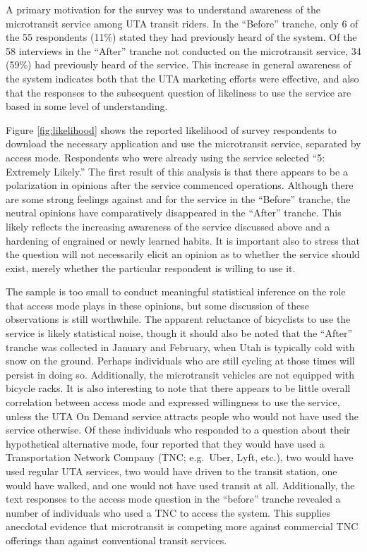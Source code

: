 \documentclass[smartcities,article,submit,moreauthors,pdftex]{mdpi}
\begin{document}
A primary motivation for the survey was to understand awareness of the
microtransit service among UTA transit riders. In the ``Before'' tranche, only 6
of the 55 respondents (11\%) stated they had previously heard of the system. Of
the 58 interviews in the ``After'' tranche not conducted on the microtransit
service, 34 (59\%) had previously heard of the service. This increase in general
awareness of the system indicates both that the UTA marketing efforts were
effective, and also that the responses to the subsequent question of likeliness
to use the service are based in some level of understanding.

Figure \ref{fig:likelihood} shows the reported likelihood of survey respondents
to download the necessary application and use the microtransit service,
separated by access mode. Respondents who were already using the service
selected ``5: Extremely Likely.'' The first result of this analysis is that there
appears to be a polarization in opinions after the service commenced operations.
Although there are some strong feelings against and for the service in the
``Before'' tranche, the neutral opinions have comparatively disappeared in the
``After'' tranche. This likely reflects the increasing awareness of the service
discussed above and a hardening of engrained or newly learned habits. It is
important also to stress that the question will not necessarily elicit an
opinion as to whether the service should exist, merely whether the particular
respondent is willing to use it.

The sample is too small to conduct meaningful statistical inference on the role
that access mode plays in these opinions, but some discussion of these
observations is still worthwhile. The apparent reluctance of bicyclists to use
the service is likely statistical noise, though it should also be noted that the
``After'' tranche was collected in January and February, when Utah is typically
cold with snow on the ground. Perhaps individuals who are still cycling at those
times will persist in doing so. Additionally, the microtransit vehicles are not
equipped with bicycle racks. It is also interesting to note that there
appears to be little overall correlation between access mode and expressed
willingness to use the service, unless the UTA On Demand service attracts people
who would not have used the service otherwise. Of these individuals who
responded to a question about their hypothetical alternative mode, four reported
that they would have used a Transportation Network Company (TNC; e.g.~Uber,
Lyft, etc.), two would have used regular UTA services, two would have driven to
the transit station, one would have walked, and one would not have used transit
at all. Additionally, the text responses to the access mode question in the
``before'' tranche revealed a number of individuals who used a TNC to access the
system. This supplies anecdotal evidence that microtransit is competing more
against commercial TNC offerings than against conventional transit services.
\end{document}
